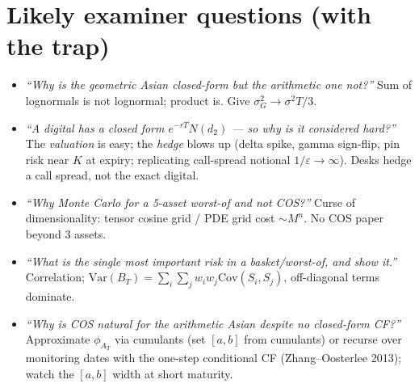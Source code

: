\documentclass[11pt]{article}
\begin{document}
\section{Likely examiner questions (with the trap)}

\begin{itemize}[leftmargin=2em]
\item \emph{``Why is the geometric Asian closed-form but the arithmetic one not?''} Sum of lognormals
is not lognormal; product is. Give $\sigma_G^2\to\sigma^2T/3$.
\item \emph{``A digital has a closed form $e^{-rT}N(d_2)$ --- so why is it considered hard?''} The
\emph{valuation} is easy; the \emph{hedge} blows up (delta spike, gamma sign-flip, pin risk near $K$ at
expiry; replicating call-spread notional $1/\varepsilon\to\infty$). Desks hedge a call spread, not the
exact digital.
\item \emph{``Why Monte Carlo for a 5-asset worst-of and not COS?''} Curse of dimensionality: tensor
cosine grid / PDE grid cost $\sim M^n$. No COS paper beyond 3 assets.
\item \emph{``What is the single most important risk in a basket/worst-of, and show it.''}
Correlation; $\mathrm{Var}(B_T)=\sum_i\sum_j w_iw_j\mathrm{Cov}(S_i,S_j)$, off-diagonal terms dominate.
\item \emph{``Why is COS natural for the arithmetic Asian despite no closed-form CF?''} Approximate
$\phi_{A_T}$ via cumulants (set $[a,b]$ from cumulants) or recurse over monitoring dates with the
one-step conditional CF (Zhang--Oosterlee 2013); watch the $[a,b]$ width at short maturity.
\end{itemize}
\end{document}
